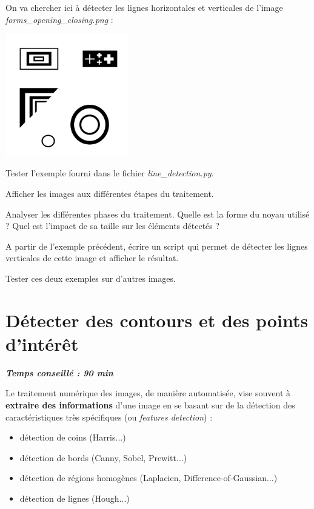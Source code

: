 \documentclass[a4paper,11pt,titlepage]{article} %
\begin{document}
On va chercher ici à détecter les lignes horizontales et verticales de l'image \textsl{\textit{forms\_opening\_closing.png}} :

\begin{center}
	\includegraphics[width=0.4\textwidth]{images/forms_opening_closing_inv.png}
\end{center}


\Manip Tester l'exemple fourni dans le fichier \textsl{line\_detection.py}.

\Manip Afficher les images aux différentes étapes du traitement.

\Quest Analyser les différentes phases du traitement. Quelle est la forme du noyau utilisé ? Quel est l'impact de sa taille sur les éléments détectés ?

\Manip A partir de l'exemple précédent, écrire un script qui permet de détecter les lignes verticales de cette image et afficher le résultat.

\Manip Tester ces deux exemples sur d'autres images.


\newpage
\section{Détecter des contours et des points d'intérêt}

\begin{center} \textbf{\textit{Temps conseillé : 90 min}} \end{center}

Le traitement numérique des images, de manière automatisée, vise souvent à \textbf{extraire des informations} d'une image en se basant sur de la {détection des caractéristiques} très spécifiques (ou \textit{features detection}) : 

\begin{itemize}
	\item détection de coins (Harris...)
	\item détection de bords (Canny, Sobel, Prewitt...)
	\item détection de régions homogènes (Laplacien, Difference-of-Gaussian...)
	\item détection de lignes (Hough...)
\end{itemize}
\end{document}
